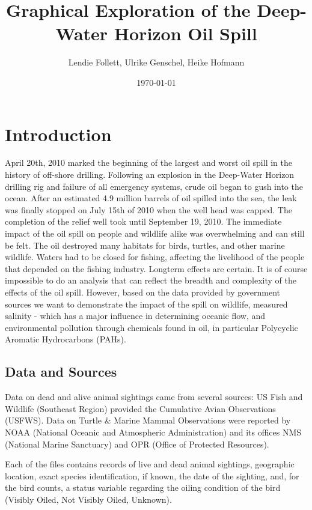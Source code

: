 \documentclass[11pt]{article}
\title{Graphical Exploration of the Deep-Water Horizon Oil Spill}
\author{Lendie Follett, Ulrike Genschel, Heike Hofmann}
\date{\today}                                           %
\begin{document}
\maketitle
\begin{abstract}
\end{abstract}
\section{Introduction}
April 20th, 2010 marked the beginning of the largest and worst oil spill in the history of off-shore drilling.  Following an explosion in the Deep-Water Horizon drilling rig and failure of all emergency systems, crude oil began to gush into the ocean.  After an estimated 4.9 million barrels of oil spilled into the sea, the leak was finally stopped on July 15th of 2010 when the well head was capped.  The completion of the relief well took until September 19, 2010.  The immediate impact of the oil spill on people and wildlife alike was overwhelming and can still be felt.  The oil destroyed many habitats for birds, turtles, and other marine wildlife.  Waters had to be closed for fishing, affecting the livelihood of the people that depended on the fishing industry. Longterm effects are certain. It is of course impossible to do an analysis that can reflect the breadth and complexity of the effects of the oil spill.  However, based on the data provided by government sources we want to demonstrate the impact of the spill on wildlife, measured salinity - which has a major influence in determining oceanic flow, and environmental pollution through chemicals found in oil, in particular Polycyclic Aromatic Hydrocarbons (PAHs). 

\subsection{Data and Sources}
Data on dead and alive animal sightings came from several sources: US Fish and Wildlife (Southeast Region) provided the Cumulative Avian Observations (USFWS).
Data on Turtle \& Marine Mammal Observations were reported by NOAA (National Oceanic and Atmospheric Administration) and its offices NMS (National Marine Sanctuary) and OPR (Office of Protected Resources). 

Each of the files contains records of live and dead animal sightings, geographic location, exact species identification, if known, the date of the sighting, and, for the bird counts, a status variable regarding the oiling condition of the bird (Visibly Oiled, Not Visibly Oiled, Unknown). 
\end{document}
